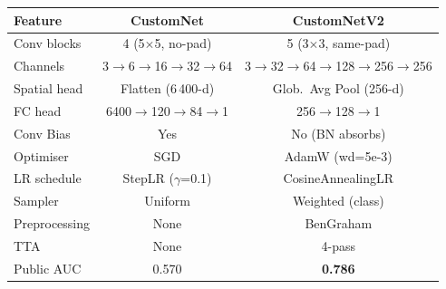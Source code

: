\documentclass[a4paper, 10pt, twocolumn]{article}
\begin{document}
\vspace{10pt}

\begin{minipage}[t]{0.47\textwidth}

\label{tab:arch}
\vspace{3pt}
\footnotesize
\setlength{\tabcolsep}{4pt}
\renewcommand{\arraystretch}{1.10}
\begin{tabular}{@{}lcc@{}}
\toprule
\textbf{Feature} & \textbf{CustomNet} & \textbf{CustomNetV2} \\
\midrule
Conv blocks  & 4 (5$\times$5, no-pad)    & 5 (3$\times$3, same-pad) \\
Channels     & 3$\to$6$\to$16$\to$32$\to$64 & 3$\to$32$\to$64$\to$128$\to$256$\to$256 \\
Spatial head & Flatten (6\,400-d)        & Glob.\ Avg Pool (256-d) \\
FC head      & 6400$\to$120$\to$84$\to$1 & 256$\to$128$\to$1 \\
Conv Bias    & Yes                       & No (BN absorbs) \\
Optimiser    & SGD                       & AdamW (wd=5e-3) \\
LR schedule  & StepLR ($\gamma$=0.1)    & CosineAnnealingLR \\
Sampler      & Uniform                   & Weighted (class) \\
Preprocessing & None                    & BenGraham \\
TTA          & None                      & 4-pass \\
\midrule
Public AUC   & 0.570                     & \textbf{0.786} \\
\bottomrule
\end{tabular}

\end{minipage}%
\hfill
\end{document}
